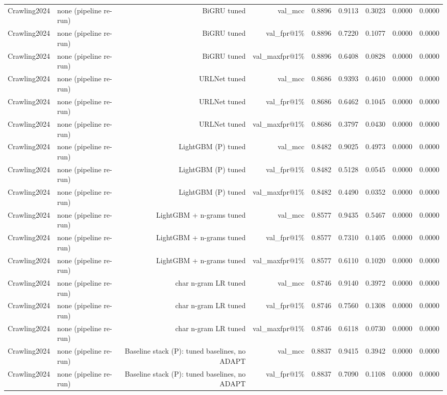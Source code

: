 \begin{table}[t]
\begin{tabular}{llrrrrrrr}
Crawling2024 & none (pipeline re-run) & BiGRU tuned & val\_mcc & 0.8896 & 0.9113 & 0.3023 & 0.0000 & 0.0000 \\
Crawling2024 & none (pipeline re-run) & BiGRU tuned & val\_fpr@1\% & 0.8896 & 0.7220 & 0.1077 & 0.0000 & 0.0000 \\
Crawling2024 & none (pipeline re-run) & BiGRU tuned & val\_maxfpr@1\% & 0.8896 & 0.6408 & 0.0828 & 0.0000 & 0.0000 \\
Crawling2024 & none (pipeline re-run) & URLNet tuned & val\_mcc & 0.8686 & 0.9393 & 0.4610 & 0.0000 & 0.0000 \\
Crawling2024 & none (pipeline re-run) & URLNet tuned & val\_fpr@1\% & 0.8686 & 0.6462 & 0.1045 & 0.0000 & 0.0000 \\
Crawling2024 & none (pipeline re-run) & URLNet tuned & val\_maxfpr@1\% & 0.8686 & 0.3797 & 0.0430 & 0.0000 & 0.0000 \\
Crawling2024 & none (pipeline re-run) & LightGBM (P) tuned & val\_mcc & 0.8482 & 0.9025 & 0.4973 & 0.0000 & 0.0000 \\
Crawling2024 & none (pipeline re-run) & LightGBM (P) tuned & val\_fpr@1\% & 0.8482 & 0.5128 & 0.0545 & 0.0000 & 0.0000 \\
Crawling2024 & none (pipeline re-run) & LightGBM (P) tuned & val\_maxfpr@1\% & 0.8482 & 0.4490 & 0.0352 & 0.0000 & 0.0000 \\
Crawling2024 & none (pipeline re-run) & LightGBM + n-grams tuned & val\_mcc & 0.8577 & 0.9435 & 0.5467 & 0.0000 & 0.0000 \\
Crawling2024 & none (pipeline re-run) & LightGBM + n-grams tuned & val\_fpr@1\% & 0.8577 & 0.7310 & 0.1405 & 0.0000 & 0.0000 \\
Crawling2024 & none (pipeline re-run) & LightGBM + n-grams tuned & val\_maxfpr@1\% & 0.8577 & 0.6110 & 0.1020 & 0.0000 & 0.0000 \\
Crawling2024 & none (pipeline re-run) & char n-gram LR tuned & val\_mcc & 0.8746 & 0.9140 & 0.3972 & 0.0000 & 0.0000 \\
Crawling2024 & none (pipeline re-run) & char n-gram LR tuned & val\_fpr@1\% & 0.8746 & 0.7560 & 0.1308 & 0.0000 & 0.0000 \\
Crawling2024 & none (pipeline re-run) & char n-gram LR tuned & val\_maxfpr@1\% & 0.8746 & 0.6118 & 0.0730 & 0.0000 & 0.0000 \\
Crawling2024 & none (pipeline re-run) & Baseline stack (P): tuned baselines, no ADAPT & val\_mcc & 0.8837 & 0.9415 & 0.3942 & 0.0000 & 0.0000 \\
Crawling2024 & none (pipeline re-run) & Baseline stack (P): tuned baselines, no ADAPT & val\_fpr@1\% & 0.8837 & 0.7090 & 0.1108 & 0.0000 & 0.0000 \\

\end{tabular}
\end{table}
